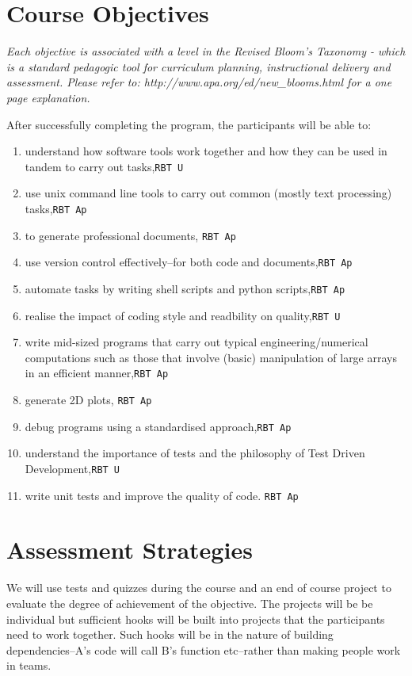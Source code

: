 \documentclass{article}
\begin{document}
\newpage

\section{Course Objectives}
\emph{Each objective is associated with a level in the Revised Bloom's
Taxonomy - which is a standard pedagogic tool for curriculum planning,
instructional delivery and assessment. Please refer to:
http://www.apa.org/ed/new\_blooms.html for a one page explanation.} 


After successfully completing the program, the participants will be able to:
\begin{enumerate}
\item \label{intro} understand how software tools work together and how they can be used in tandem to carry out tasks,\hfill \texttt{RBT U\phantom{p}}
\item \label{cmd} use unix command line tools to carry out common (mostly text processing) tasks,\hfill \texttt{RBT Ap}
\item \label{pdf} to generate professional documents, \hfill \texttt{RBT Ap}
\item \label{VC} use version control effectively--for both code and documents,\hfill \texttt{RBT Ap}
\item \label{scr} automate tasks by writing shell scripts and python scripts,\hfill \texttt{RBT Ap}
\item \label{sty} realise the impact of coding style and readbility on quality,\hfill \texttt{RBT U\phantom{p}}
\item \label{py} write mid-sized programs that carry out typical engineering/numerical computations such as those that involve (basic) manipulation of large arrays in an efficient manner,\hfill \texttt{RBT Ap}
\item \label{plot} generate 2D plots, \hfill \texttt{RBT Ap}
\item \label{dbg} debug programs using a standardised approach,\hfill \texttt{RBT Ap}
\item \label{test} understand the importance of tests and the philosophy of Test Driven Development,\hfill \texttt{RBT U\phantom{p}}
\item \label{unit} write unit tests and improve the quality of code.  \hfill \texttt{RBT Ap}
    \end{enumerate}
\section{Assessment Strategies}
We will use tests and quizzes during the course and an end of course project to evaluate the degree of achievement of the objective. The projects will be be individual but sufficient hooks will be built into projects that the participants need to work together. Such hooks will be in the nature of building dependencies--A's code will call B's function etc--rather than making people work in teams.
\end{document}
